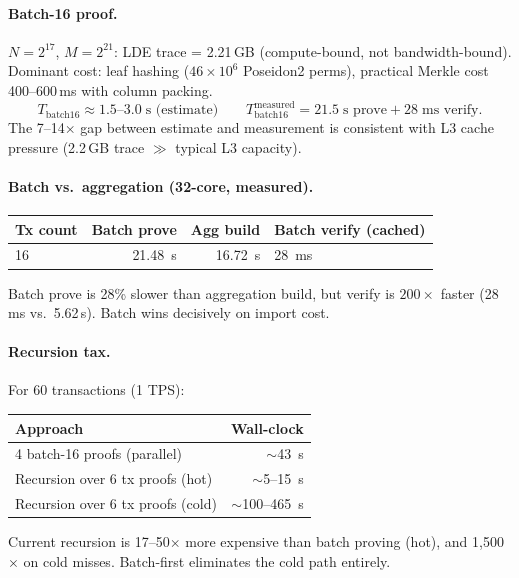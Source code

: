 \documentclass[11pt]{article}
\begin{document}
\paragraph{Batch-16 proof.}
$N = 2^{17}$, $M = 2^{21}$: LDE trace = 2.21\,GB (compute-bound, not
bandwidth-bound). Dominant cost: leaf hashing ($46 \times 10^6$ Poseidon2
perms), practical Merkle cost 400--600\,ms with column packing.
\begin{equation}
\boxed{T_{\mathrm{batch16}} \approx 1.5\text{--}3.0\;\text{s (estimate)}
\qquad T_{\mathrm{batch16}}^{\mathrm{measured}} = 21.5\;\text{s prove}
+ 28\;\text{ms verify.}}
\end{equation}
The 7--14$\times$ gap between estimate and measurement is consistent with
L3 cache pressure (2.2\,GB trace $\gg$ typical L3 capacity).

\paragraph{Batch vs.\ aggregation (32-core, measured).}
\begin{center}
\begin{tabular}{@{}lrrl@{}}
\toprule
\textbf{Tx count} & \textbf{Batch prove} & \textbf{Agg build} &
  \textbf{Batch verify (cached)} \\
\midrule
16 & 21.48~s & 16.72~s & 28~ms \\
\bottomrule
\end{tabular}
\end{center}
Batch prove is 28\% slower than aggregation build, but verify is $200\times$
faster (28\,ms vs.\ 5.62\,s). Batch wins decisively on import cost.

\paragraph{Recursion tax.}
For 60 transactions (1 TPS):
\begin{center}
\begin{tabular}{@{}lr@{}}
\toprule
\textbf{Approach} & \textbf{Wall-clock} \\
\midrule
4 batch-16 proofs (parallel) & $\sim$43~s \\
Recursion over 6 tx proofs (hot) & $\sim$5--15~s \\
Recursion over 6 tx proofs (cold) & $\sim$100--465~s \\
\bottomrule
\end{tabular}
\end{center}
Current recursion is 17--50$\times$ more expensive than batch proving (hot),
and 1{,}500$\times$ on cold misses. Batch-first eliminates the cold path entirely.
\end{document}
